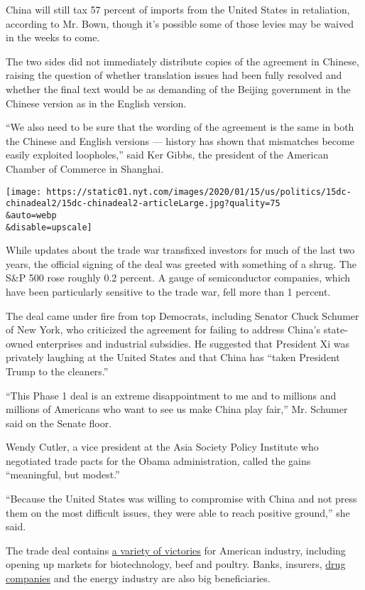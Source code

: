 China will still tax 57 percent of imports from the United States in
retaliation, according to Mr. Bown, though it's possible some of those
levies may be waived in the weeks to come.

The two sides did not immediately distribute copies of the agreement in
Chinese, raising the question of whether translation issues had been
fully resolved and whether the final text would be as demanding of the
Beijing government in the Chinese version as in the English version.

``We also need to be sure that the wording of the agreement is the same
in both the Chinese and English versions --- history has shown that
mismatches become easily exploited loopholes,'' said Ker Gibbs, the
president of the American Chamber of Commerce in Shanghai.

\texttt{[image: https://static01.nyt.com/images/2020/01/15/us/politics/15dc-chinadeal2/15dc-chinadeal2-articleLarge.jpg?quality=75\\\&auto=webp\\\&disable=upscale]}

While updates about the trade war transfixed investors for much of the
last two years, the official signing of the deal was greeted with
something of a shrug. The S\&P 500 rose roughly 0.2 percent. A gauge of
semiconductor companies, which have been particularly sensitive to the
trade war, fell more than 1 percent.

The deal came under fire from top Democrats, including Senator Chuck
Schumer of New York, who criticized the agreement for failing to address
China's state-owned enterprises and industrial subsidies. He suggested
that President Xi was privately laughing at the United States and that
China has ``taken President Trump to the cleaners.''

``This Phase 1 deal is an extreme disappointment to me and to millions
and millions of Americans who want to see us make China play fair,'' Mr.
Schumer said on the Senate floor.

Wendy Cutler, a vice president at the Asia Society Policy Institute who
negotiated trade pacts for the Obama administration, called the gains
``meaningful, but modest.''

``Because the United States was willing to compromise with China and not
press them on the most difficult issues, they were able to reach
positive ground,'' she said.

The trade deal contains
\href{https://www.nytimes.com/2020/01/14/business/economy/trump-china-trade-deal.html}{a
variety of victories} for American industry, including opening up
markets for biotechnology, beef and poultry. Banks, insurers,
\href{https://www.nytimes.com/2019/08/27/business/china-cheap-drug-imports.html}{drug
companies} and the energy industry are also big beneficiaries.

